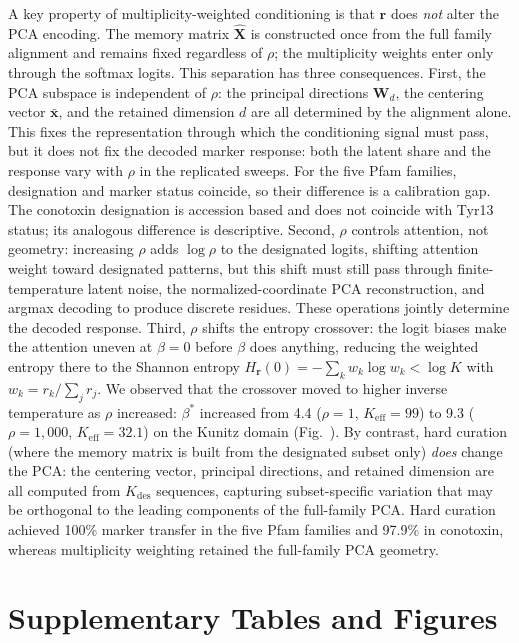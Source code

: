 A key property of multiplicity-weighted conditioning is that $\mathbf{r}$
does \emph{not} alter the PCA encoding. The memory matrix
$\hat{\mathbf{X}}$ is constructed once from the full family alignment and
remains fixed regardless of $\rho$; the multiplicity weights enter only
through the softmax logits. This separation has three consequences.
First, the PCA subspace is independent of $\rho$: the principal directions
$\mathbf{W}_d$, the centering vector $\bar{\mathbf{x}}$, and the retained
dimension $d$ are all determined by the alignment alone. This fixes the
representation through which the conditioning signal must pass, but it does
not fix the decoded marker response: both the latent share and the response
vary with $\rho$ in the replicated sweeps. For the five Pfam families,
designation and marker status coincide, so their difference is a calibration
gap. The conotoxin designation is accession based and does not coincide with
Tyr13 status; its analogous difference is descriptive. Second,
$\rho$ controls attention, not
geometry: increasing $\rho$ adds $\log\rho$ to the designated logits, shifting
attention weight toward designated patterns, but this shift must still pass
through finite-temperature latent noise, the normalized-coordinate PCA
reconstruction, and argmax decoding to produce discrete residues. These
operations jointly determine the decoded response. Third, $\rho$ shifts the
entropy crossover: the logit biases make the attention uneven at $\beta = 0$
before $\beta$ does anything, reducing the weighted entropy there to the Shannon
entropy $H_{\mathbf{r}}(0) = -\sum_k w_k \log w_k < \log K$ with
$w_k = r_k / \sum_j r_j$. We observed that the crossover moved to higher inverse
temperature as $\rho$ increased:
$\beta^{*}$ increased from 4.4 ($\rho=1$, $K_{\mathrm{eff}} = 99$) to 9.3
($\rho=1{,}000$, $K_{\mathrm{eff}} = 32.1$) on the Kunitz domain
(Fig.~). By contrast, hard curation (where the
memory matrix is built from the designated subset only) \emph{does} change
the PCA: the centering vector, principal directions, and retained dimension
are all computed from $K_{\mathrm{des}}$ sequences, capturing
subset-specific variation that may be orthogonal to the leading components
of the full-family PCA. Hard curation achieved 100\% marker transfer in the
five Pfam families and 97.9\% in conotoxin, whereas multiplicity weighting
retained the full-family PCA geometry.

\section{Supplementary Tables and Figures}\label{app:tables-figures}

